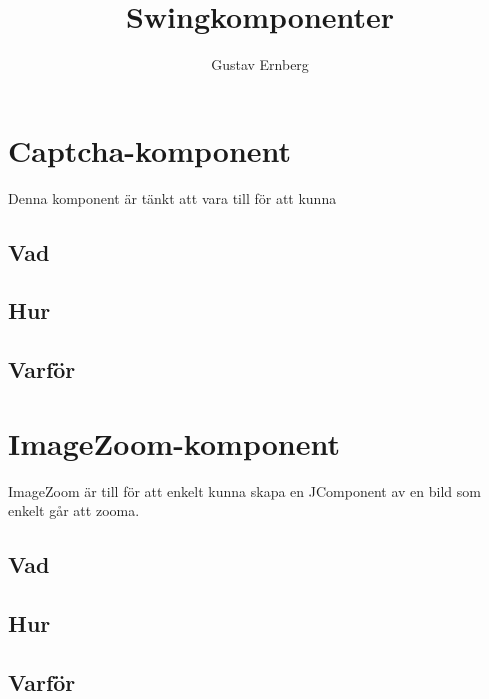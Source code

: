 \documentclass[10pt,a4paper,final]{article}
\author{Gustav Ernberg}
\title{Swingkomponenter}
\begin{document}
\maketitle
\section{Captcha-komponent}
Denna komponent är tänkt att vara till för att kunna
\subsection{Vad}
\subsection{Hur}
\subsection{Varför}
\section{ImageZoom-komponent}
ImageZoom är till för att enkelt kunna skapa en JComponent av en bild som enkelt går att zooma.
\subsection{Vad}
\subsection{Hur}
\subsection{Varför}
\end{document}
